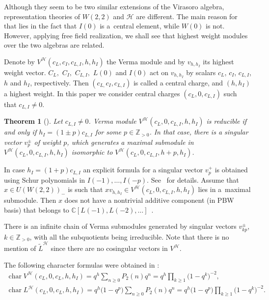 \documentclass[11pt]{article}
\numberwithin{equation}{section}
\newtheorem{Theorem}{Theorem}[section]
\newcommand{\N}{{\mathbb Z}_{> 0} }
\newcommand{\C}{\mathbb C}
\newcommand{\HVir}{\mathcal H}
\DeclareMathOperator{\ch}{char}
\begin{document}
Although they seem to be two similar extensions of the Virasoro algebra, representation theories of $W(2,2)$ and $\HVir$ are dif\/ferent. The main reason for that lies in the fact that $I(0) $ is a~central element, while $W(0) $ is not. However, applying free f\/ield realization, we shall see that highest weight modules over the two algebras are related.

Denote by $V^{\HVir} ( c_{L},c_{I},c_{L,I},h,h_{I} ) $ the Verma module and by $v_{h,h_I}$ its highest weight vector. $C_{L},$ $C_{I},$ $C_{L,I},$ $L(0) $ and $I(0) $ act on $v_{h,h_I}$ by scalars $c_{L}$, $c_{I}$, $c_{L,I}$, $h$ and $h_{I}$, respectively. Then $\left(c_{L,}c_{I},c_{L,I}\right) $ is called a central charge, and $(h,h_{I}) $ a highest weight. In this paper we consider central charges $(c_{L},0,c_{L,I}) $ such that $c_{L,I}\neq0$.

\begin{Theorem}[\cite{Billig}]\label{billig}
Let $c_{L,I}\neq0$. Verma module $V^{\HVir}(c_{L},0,c_{L,I},h,h_{I}) $ is reducible if and only if $h_{I}=(1\pm p) c_{L,I}$ for some $p\in\N$. In that case, there is a singular vector $v_p^{\pm}$ of weight $p$, which generates a maximal submodule in $V^{\HVir} ( c_{L},0,c_{L,I},h,h_{I} ) $ isomorphic to $V^{\HVir} ( c_{L},0,c_{L,I},h+p,h_{I} ) $.
\end{Theorem}

\begin{Remark} \label{kompon}
In case $h_{I}=(1+p) c_{L,I}$ an explicit formula for a singular vector $v_p^+$ is obtained using Schur polynomials in $I(-1), \ldots, I(-p)$. See~\cite{nas} for details. Assume that $x \in U(W(2,2))_-$ is such that $xv_{h,h_I} \in V^{\HVir} ( c_{L},0,c_{L,I},h,h_{I} ) $ lies in a~maximal submodule. Then $x$ does not have a nontrivial additive component (in PBW basis) that belongs to $\C [ L(-1) ,L(-2), \ldots ]$~\cite{Billig}.
\end{Remark}

There is an inf\/inite chain of Verma submodules generated by singular vectors $v_{kp}^{\pm}$, $k\in\N$, with all the subquotients being irreducible. Note that there is no mention of $\widetilde{L}^{\HVir}$ since there are no cosingular vectors in $V^{\HVir}$.

The following character formulas were obtained in \cite{Billig}:
\begin{gather*}
\ch V^{\HVir}( c_{L},0,c_{L},h,h_{I}) =q^{h}\sum_{n\geq0}P_{2}(n)q^{n}=q^{h}\prod\limits_{k\geq1}\big(1-q^{k}\big)^{-2}, \\
\ch L^{\HVir} ( c_{L},0,c_{L},h,h_{I} ) =q^{h}\big(1-q^{p}\big)\sum_{n\geq0}P_{2}(n)q^{n} =q^{h}\big(1-q^{p}\big)\prod\limits_{k\geq1}\big(1-q^{k}\big)^{-2}.
\end{gather*}
\end{document}
